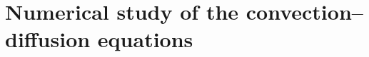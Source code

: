 
\section{Numerical study of the convection--diffusion equations} \label{sec:numerical_study}








